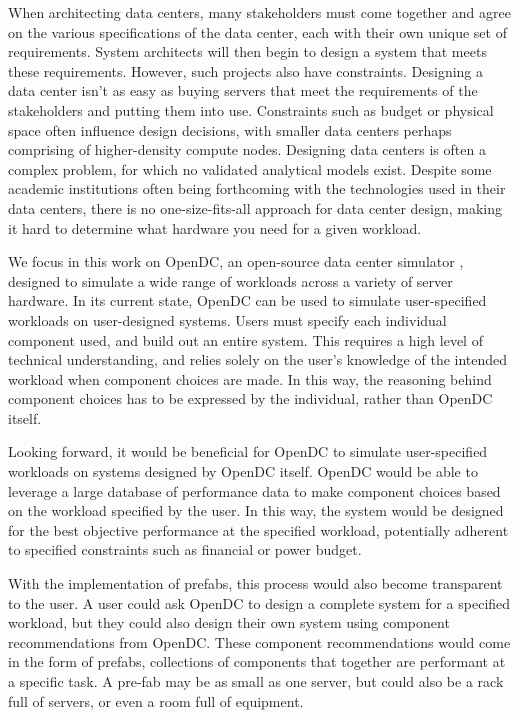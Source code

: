 \documentclass[11pt]{article}
\begin{document}
	When architecting data centers, many stakeholders must come together and agree on the various specifications of the data center, each with their own unique set of requirements. 
	System architects will then begin to design a system that meets these requirements. 
	However, such projects also have constraints. 
	Designing a data center isn't as easy as buying servers that meet the requirements of the stakeholders and putting them into use. 
	Constraints such as budget or physical space often influence design decisions, with smaller data centers perhaps comprising of higher-density compute nodes. 
	Designing data centers is often a complex problem, for which no validated analytical models exist. 
	Despite some academic institutions often being forthcoming with the technologies used in their data centers, there is no one-size-fits-all approach for data center design, making it hard to determine what hardware you need for a given workload.

	We focus in this work on OpenDC, an open-source data center simulator \cite{Iosup2017}, designed to simulate a wide range of workloads across a variety of server hardware. 
	In its current state, OpenDC can be used to simulate user-specified workloads on user-designed systems. 
	Users must specify each individual component used, and build out an entire system. 
	This requires a high level of technical understanding, and relies solely on the user's knowledge of the intended workload when component choices are made. 
	In this way, the reasoning behind component choices has to be expressed by the individual, rather than OpenDC itself. 

	Looking forward, it would be beneficial for OpenDC to simulate user-specified workloads on systems designed by OpenDC itself. 
	OpenDC would be able to leverage a large database of performance data to make component choices based on the workload specified by the user. 
	In this way, the system would be designed for the best objective performance at the specified workload, potentially adherent to specified constraints such as financial or power budget. 

	With the implementation of prefabs, this process would also become transparent to the user. 
	A user could ask OpenDC to design a complete system for a specified workload, but they could also design their own system using component recommendations from OpenDC. 
	These component recommendations would come in the form of prefabs, collections of components that together are performant at a specific task. 
	A pre-fab may be as small as one server, but could also be a rack full of servers, or even a room full of equipment. 
\end{document}
